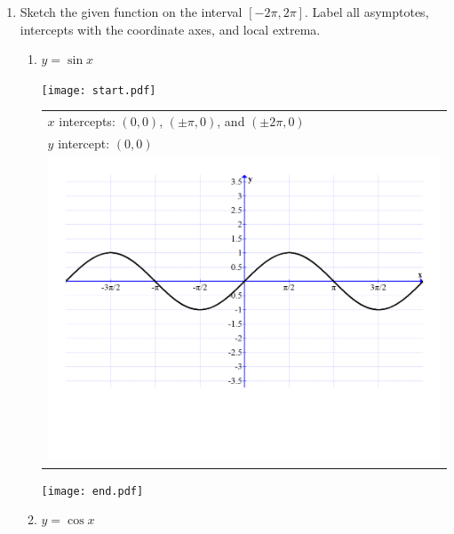 \documentclass[12pt]{article}
\begin{document}
\begin{enumerate}

\item Sketch the given function on the interval $[-2\pi,2\pi]$.  Label all asymptotes, intercepts with the coordinate axes, and local extrema.

\begin{enumerate}

\item $\displaystyle y=\sin{x}$

\texttt{[image: start.pdf]}
{\begin{tabular}{l}
$x$ intercepts: $\displaystyle \left(0,0 \right)$, $\displaystyle \left(\pm \pi,0 \right)$, and $\displaystyle \left(\pm 2\pi,0 \right)$\\
$y$ intercept: $(0,0)$\\
\includegraphics[scale=0.3]{sine.pdf}
\end{tabular}
}
\texttt{[image: end.pdf]}


\item $\displaystyle y=\cos{x}$


\end{enumerate}
\end{enumerate}
\end{document}
